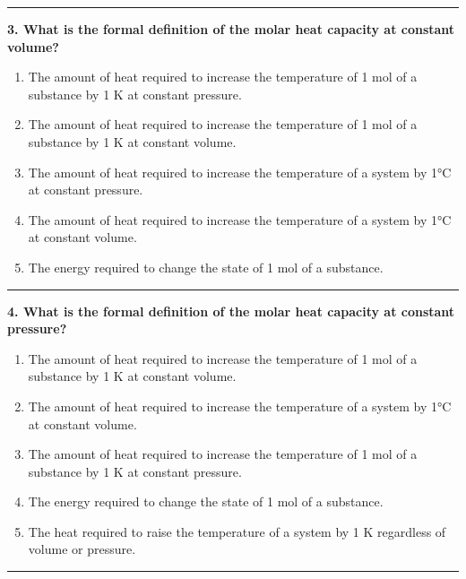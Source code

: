 \documentclass[
  9pt,
]{extbook}
\providecommand{\tightlist}{%
  \setlength{\itemsep}{0pt}\setlength{\parskip}{0pt}}
\theoremstyle{definition}
\theoremstyle{definition}
\theoremstyle{definition}
\theoremstyle{definition}
\theoremstyle{remark}
\begin{document}
\begin{center}\rule{0.5\linewidth}{0.5pt}\end{center}

\textbf{3. What is the formal definition of the molar heat capacity at constant volume?}

\begin{enumerate}
\def\labelenumi{\alph{enumi}.}
\tightlist
\item
  The amount of heat required to increase the temperature of 1 mol of a substance by 1 K at constant pressure.
\item
  The amount of heat required to increase the temperature of 1 mol of a substance by 1 K at constant volume.
\item
  The amount of heat required to increase the temperature of a system by 1°C at constant pressure.
\item
  The amount of heat required to increase the temperature of a system by 1°C at constant volume.
\item
  The energy required to change the state of 1 mol of a substance.
\end{enumerate}

\begin{center}\rule{0.5\linewidth}{0.5pt}\end{center}

\textbf{4. What is the formal definition of the molar heat capacity at constant pressure?}

\begin{enumerate}
\def\labelenumi{\alph{enumi}.}
\tightlist
\item
  The amount of heat required to increase the temperature of 1 mol of a substance by 1 K at constant volume.
\item
  The amount of heat required to increase the temperature of a system by 1°C at constant volume.
\item
  The amount of heat required to increase the temperature of 1 mol of a substance by 1 K at constant pressure.
\item
  The energy required to change the state of 1 mol of a substance.
\item
  The heat required to raise the temperature of a system by 1 K regardless of volume or pressure.
\end{enumerate}

\begin{center}\rule{0.5\linewidth}{0.5pt}\end{center}
\end{document}

